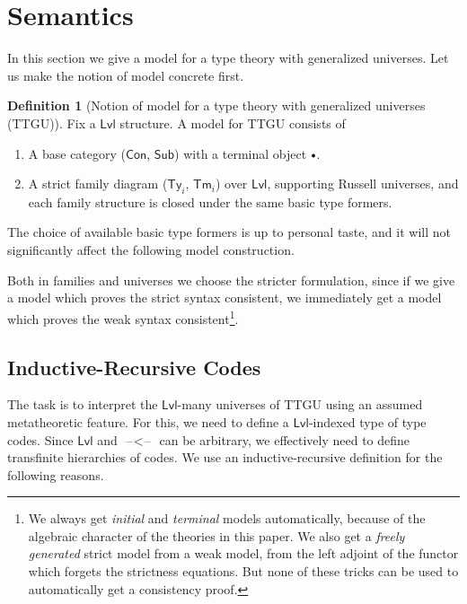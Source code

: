 \documentclass[a4paper,UKenglish,cleveref, autoref, thm-restate]{lipics-v2021}
\theoremstyle{remark}
\theoremstyle{definition}
\newtheorem{mydefinition}{Definition}
\newcommand{\Con}{\mathsf{Con}}
\newcommand{\Ty}{\mathsf{Ty}}
\newcommand{\Tm}{\mathsf{Tm}}
\newcommand{\Sub}{\mathsf{Sub}}
\newcommand{\emptycon}{\scaleobj{.75}\bullet}
\newcommand{\blank}{\mathord{\hspace{1pt}\text{--}\hspace{1pt}}}
\newcommand{\Lvl}{\mathsf{Lvl}}
\begin{document}
\section{Semantics}
\label{sec:semantics}

In this section we give a model for a type theory with generalized
universes. Let us make the notion of model concrete first.

\begin{mydefinition}[Notion of model for a type theory with generalized universes (TTGU)]
Fix a $\Lvl$ structure. A model for TTGU consists of
\begin{enumerate}
  \item A base category ($\Con$, $\Sub$) with a terminal object $\emptycon$.
  \item A strict family diagram ($\Ty_i$, $\Tm_i$) over $\Lvl$, supporting Russell
        universes, and each family structure is closed under the same basic type formers.
\end{enumerate}
\end{mydefinition}

The choice of available basic type formers is up to personal taste, and it will
not significantly affect the following model construction.

Both in families and universes we choose the stricter formulation, since if we
give a model which proves the strict syntax consistent, we immediately get a model which
proves the weak syntax consistent\footnote{We always get \emph{initial} and \emph{terminal}
models automatically, because of the algebraic character of the theories in this paper. We
also get a \emph{freely generated} strict model from a weak model, from the left adjoint
of the functor which forgets the strictness equations. But none of these tricks can be used
to automatically get a consistency proof.}.

\subsection{Inductive-Recursive Codes}
\label{sec:inductive_recursive_codes}

The task is to interpret the $\Lvl$-many universes of TTGU using an assumed
metatheoretic feature. For this, we need to define a $\Lvl$-indexed type of type
codes. Since $\Lvl$ and $\!\blank<\!\blank$ can be arbitrary, we effectively
need to define transfinite hierarchies of codes. We use an inductive-recursive
\cite{dybjer99finite} definition for the following reasons.
\end{document}
